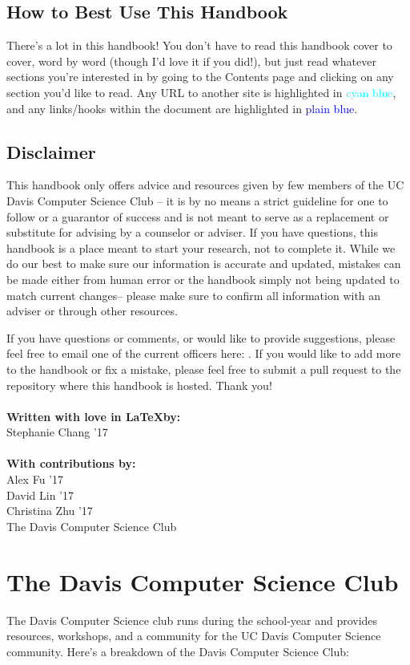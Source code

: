 \documentclass{article}
\begin{document}
\subsection{How to Best Use This Handbook}
There's a lot in this handbook! You don't have to read this handbook cover to
cover, word by word (though I'd love it if you did!), but just read whatever
sections you're interested in by going to the Contents page and clicking on any
section you'd like to read. Any URL to another site is highlighted in
\textcolor{cyan}{cyan blue}, and any links/hooks within the document are
highlighted in \textcolor{blue}{plain blue}.

\subsection{Disclaimer}
This handbook only offers advice and resources given by few members of the UC
Davis Computer Science Club -- it is by no means a strict guideline for one to
follow or a guarantor of success and is not meant to serve as a replacement or
substitute for advising by a counselor or adviser. If you have questions, this
handbook is a place meant to start your research, not to complete it. While we
do our best to make sure our information is accurate and updated, mistakes can
be made either from human error or the handbook simply not being updated to
match current changes-- please make sure to confirm all information with an
adviser or through other resources.

If you have questions or comments, or would like to provide suggestions, please
feel free to email one of the current officers here:
. If you would like to add more to the handbook or fix a
mistake, please feel free to submit a pull request to the repository where this
handbook is hosted. Thank you! \\\\
\textbf{Written with love in \LaTeX by:} \\
Stephanie Chang '17 \\ \\ 
\textbf{With contributions by:} \\
Alex Fu '17\\
David Lin '17\\
Christina Zhu '17\\
The Davis Computer Science Club\\

\newpage
\section {The Davis Computer Science Club}
\label{sec:DCSC}
The Davis Computer Science club runs during the school-year and provides
resources, workshops, and a community for the UC Davis Computer Science
community. Here's a breakdown of the Davis Computer Science Club:
\end{document}
